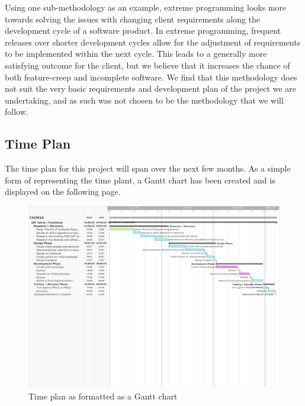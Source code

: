 \documentclass{article}
\begin{document}
Using one sub-methodology as an example, extreme programming looks more towards solving the issues with changing client requirements along
the development cycle of a software product. In extreme programming, frequent releases over shorter development cycles allow for the
adjustment of requirements to be implemented within the next cycle. This leads to a generally more satisfying outcome for the client, but we
believe that it increases the chance of both feature-creep and incomplete software. We find that this methodology does not suit the very
basic requirements and development plan of the project we are undertaking, and as such was not chosen to be the methodology that we will
follow.

\subsection{Time Plan}
The time plan for this project will span over the next few months. As a simple form of representing the time plant, a Gantt chart has been
created and is displayed on the following page.

\begin{figure}
    \caption{Time plan as formatted as a Gantt chart}
    \includegraphics[width=.8\paperwidth]{gantt.jpg}
\end{figure}
\end{document}
